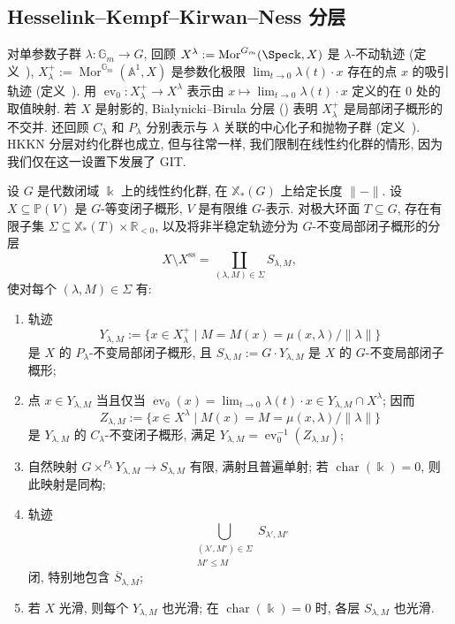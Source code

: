 \subsection{Hesselink--Kempf--Kirwan--Ness 分层}\label{src:8.7.1-subsection}
对单参数子群 $\lambda:\mathbb G_m\to G$, 回顾 $X^\lambda:=\operatorname{Mor}^{\mathbb G_m}(\Spec\Bbbk,X)$ 是 $\lambda$-不动轨迹 (定义~), $X_\lambda^+:=\operatorname{Mor}^{\mathbb G_m}(\mathbb A^1,X)$ 是参数化极限 $\lim_{t\to0}\lambda(t)\cdot x$ 存在的点 $x$ 的吸引轨迹 (定义~). 用 $\operatorname{ev}_0:X_\lambda^+\to X^\lambda$ 表示由 $x\mapsto\lim_{t\to0}\lambda(t)\cdot x$ 定义的在 $0$ 处的取值映射. 若 $X$ 是射影的, Białynicki--Birula 分层 () 表明 $X_\lambda^+$ 是局部闭子概形的不交并. 还回顾 $C_\lambda$ 和 $P_\lambda$ 分别表示与 $\lambda$ 关联的中心化子和抛物子群 (定义~). HKKN 分层对约化群也成立, 但与往常一样, 我们限制在线性约化群的情形, 因为我们仅在这一设置下发展了 GIT.
\begin{theorem}[HKKN 分层]\label{src:8.7.1}
设 $G$ 是代数闭域 $\Bbbk$ 上的线性约化群, 在 $\mathbb X_*(G)$ 上给定长度 $\|{-}\|$. 设 $X\subseteq\mathbb P(V)$ 是 $G$-等变闭子概形, $V$ 是有限维 $G$-表示. 对极大环面 $T\subseteq G$, 存在有限子集 $\Sigma\subseteq\mathbb X_*(T)\times\mathbb R_{<0}$, 以及将非半稳定轨迹分为 $G$-不变局部闭子概形的分层
\[
X\setminus X^{\mathrm{ss}}=\coprod_{(\lambda,M)\in\Sigma}S_{\lambda,M},
\]
使对每个 $(\lambda,M)\in\Sigma$ 有:
\begin{enumerate}[(1)]
\item 轨迹
\[
Y_{\lambda,M}:=\{x\in X_\lambda^+\mid M=M(x)=\mu(x,\lambda)/\|\lambda\|\}
\]
是 $X$ 的 $P_\lambda$-不变局部闭子概形, 且 $S_{\lambda,M}:=G\cdot Y_{\lambda,M}$ 是 $X$ 的 $G$-不变局部闭子概形;
\item 点 $x\in Y_{\lambda,M}$ 当且仅当 $\operatorname{ev}_0(x)=\lim_{t\to0}\lambda(t)\cdot x\in Y_{\lambda,M}\cap X^\lambda$; 因而
\[
Z_{\lambda,M}:=\{x\in X^\lambda\mid M(x)=M=\mu(x,\lambda)/\|\lambda\|\}
\]
是 $Y_{\lambda,M}$ 的 $C_\lambda$-不变闭子概形, 满足 $Y_{\lambda,M}=\operatorname{ev}_0^{-1}(Z_{\lambda,M})$;
\item 自然映射 $G\times^{P_\lambda}Y_{\lambda,M}\to S_{\lambda,M}$ 有限, 满射且普遍单射; 若 $\operatorname{char}(\Bbbk)=0$, 则此映射是同构;
\item 轨迹
\[
\bigcup_{\substack{(\lambda',M')\in\Sigma\\M'\leq M}}S_{\lambda',M'}
\]
闭, 特别地包含 $\overline S_{\lambda,M}$;
\item 若 $X$ 光滑, 则每个 $Y_{\lambda,M}$ 也光滑; 在 $\operatorname{char}(\Bbbk)=0$ 时, 各层 $S_{\lambda,M}$ 也光滑.
\end{enumerate}
\end{theorem}
